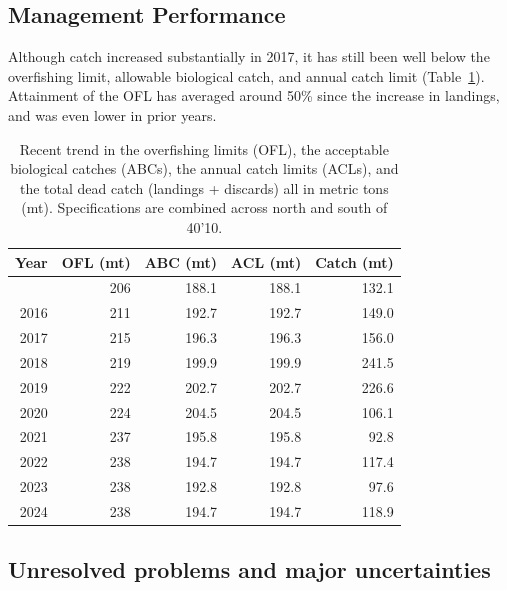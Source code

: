 \documentclass[
]{scrartcl}
\begin{document}
\endgroup

\subsection{Management Performance}\label{management-performance}

Although catch increased substantially in 2017, it has still been well
below the overfishing limit, allowable biological catch, and annual
catch limit (Table~\ref{tbl-es-management}). Attainment of the OFL has
averaged around 50\% since the increase in landings, and was even lower
in prior years.

\begingroup
\fontsize{9.0pt}{10.8pt}\selectfont

\begin{longtable}{rrrrr}

\caption{\label{tbl-es-management}Recent trend in the overfishing limits
(OFL), the acceptable biological catches (ABCs), the annual catch limits
(ACLs), and the total dead catch (landings + discards) all in metric
tons (mt). Specifications are combined across north and south of 40'10.}

\tabularnewline

\toprule
Year & OFL (mt) & ABC (mt) & ACL (mt) & Catch (mt) \\ 
\midrule\addlinespace[2.5pt]
2015 & 206 & 188.1 & 188.1 & 132.1 \\ 
2016 & 211 & 192.7 & 192.7 & 149.0 \\ 
2017 & 215 & 196.3 & 196.3 & 156.0 \\ 
2018 & 219 & 199.9 & 199.9 & 241.5 \\ 
2019 & 222 & 202.7 & 202.7 & 226.6 \\ 
2020 & 224 & 204.5 & 204.5 & 106.1 \\ 
2021 & 237 & 195.8 & 195.8 & 92.8 \\ 
2022 & 238 & 194.7 & 194.7 & 117.4 \\ 
2023 & 238 & 192.8 & 192.8 & 97.6 \\ 
2024 & 238 & 194.7 & 194.7 & 118.9 \\ 
\bottomrule

\end{longtable}

\endgroup

\subsection{Unresolved problems and major
uncertainties}\label{unresolved-problems-and-major-uncertainties}
\end{document}

